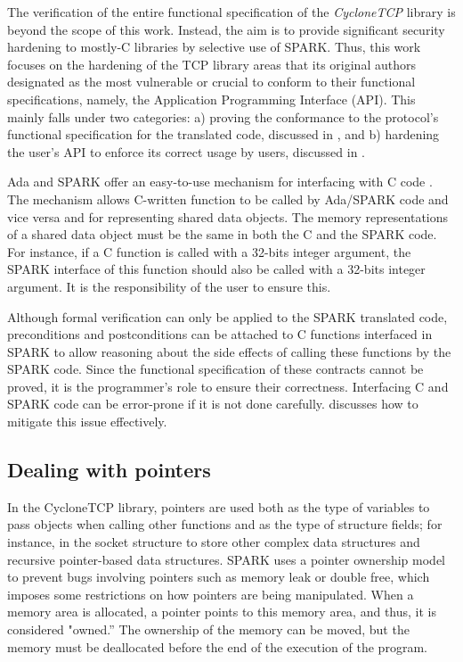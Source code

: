 \documentclass[conference]{IEEEtran}
\begin{document}
The verification of the entire functional specification of the \emph{CycloneTCP} library is beyond the scope of this work. Instead, the aim is to provide significant security hardening to mostly-C libraries by selective use of SPARK. Thus, this work focuses on the hardening of the TCP library areas that its original authors designated as the most vulnerable or crucial to conform to their functional specifications, namely, the Application Programming Interface (API). This mainly falls under two categories: a) proving the conformance to the protocol's functional specification for the translated code, discussed in , and b) hardening the user's API to enforce its correct usage by users, discussed in .

Ada and SPARK offer an easy-to-use mechanism for interfacing with C code \cite{}. The mechanism allows C-written function to be called by Ada/SPARK code and vice versa and for representing shared data objects. The memory representations of a shared data object must be the same in both the C and the SPARK code. For instance, if a C function is called with a 32-bits integer argument, the SPARK interface of this function should also be called with a 32-bits integer argument. It is the responsibility of the user to ensure this.

Although formal verification can only be applied to the SPARK translated code,  preconditions and postconditions can be attached to C functions interfaced in SPARK to allow reasoning about the side effects of calling these functions by the SPARK code. Since the functional specification of these contracts cannot be proved, it is the programmer's role to ensure their correctness. Interfacing C and SPARK code can be error-prone if it is not done carefully.  discusses how to mitigate this issue effectively.


\subsection{Dealing with pointers}
\label{sec:pointers}

In the CycloneTCP library, pointers are used both as the type of variables to pass objects when calling other functions and as the type of structure fields; for instance, in the socket structure to store other complex data structures and recursive pointer-based data structures. SPARK uses a pointer ownership model to prevent bugs involving pointers such as memory leak or double free, which imposes some restrictions on how pointers are being manipulated. When a memory area is allocated, a pointer points to this memory area, and thus, it is considered "owned.'' The ownership of the memory can be moved, but the memory must be deallocated before the end of the execution of the program.
\end{document}
